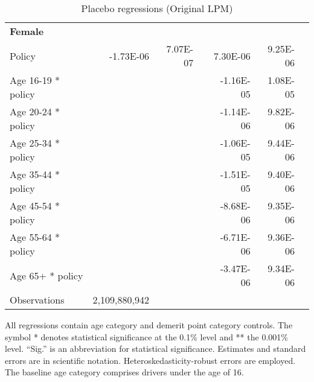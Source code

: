 \begin{table}
\begin{tabular}{l r r l r r l}
\hline 

\textbf{Female} \\ 

Policy             &  -1.73E-06        &  7.07E-07       &            &  7.30E-06        &  9.25E-06       &            \\ 
Age 16-19 * policy           & & &  &  -1.16E-05        &  1.08E-05       &            \\ 
Age 20-24 * policy           & & &  &  -1.14E-06        &  9.82E-06       &            \\ 
Age 25-34 * policy           & & &  &  -1.06E-05        &  9.44E-06       &            \\ 
Age 35-44 * policy           & & &  &  -1.51E-05        &  9.40E-06       &            \\ 
Age 45-54 * policy           & & &  &  -8.68E-06        &  9.35E-06       &            \\ 
Age 55-64 * policy           & & &  &  -6.71E-06        &  9.36E-06       &            \\ 
Age 65+ * policy           & & &  &  -3.47E-06        &  9.34E-06       &            \\ 
Observations & 2,109,880,942  \\ 


\hline 

\end{tabular} 
\caption{Placebo regressions (Original LPM)} 
All regressions contain age category and demerit point category controls. 
The symbol * denotes statistical significance at the 0.1\% level 
and ** the 0.001\% level. 
``Sig.'' is an abbreviation for statistical significance. 
Estimates and standard errors are in scientific notation. 
Heteroskedasticity-robust errors are employed. 
The baseline age category comprises drivers under the age of 16. 
\label{tab:orig_placebo_regs} 
\end{table} 
 
